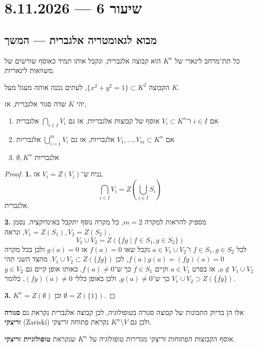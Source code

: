 \section{שיעור 6 --- 8.11.2026}
\subsection{מבוא לגאומטריה אלגברית --- המשך}
\begin{example}
	כל תת־מרחב לינארי של $K^n$ הוא קבוצה אלגברית, ונקבל אותו תמיד כאוסף שורשים של משוואות לינאריות.
\end{example}
\begin{example}
	הקבוצה $\{ x^2 + y^2 = 1 \} \subset K^2$, לעתים נכנה אותה מעגל מעל $K$.
\end{example}
\begin{proposition}
	יהי $K$ שדה סגור אלגברית, אז,
	\begin{enumerate}
		\item אם $i \in I$ ו־$V_i \subset K^n$ אוסף של קבוצות אלגבריות, אז גם $\bigcap_{i \in I} V_i$ אלגברית
		\item אם $V_1, \ldots, V_m \subset K^n$ אלגבריות, אז גם $\bigcup_{i = 1}^m V_i$ אלגבריות
		\item $\emptyset, K^n$ אלגבריות
	\end{enumerate}
\end{proposition}
\begin{proof}
	\textbf{1.}
	נניח ש־$V_i = Z(V_i)$ אז,
	\[
		\bigcap_{i \in I} V_i
		= Z(\bigcup_{i \in I} S_i)
	\]
	אלגברית.

	\textbf{2.}
	מספיק להראות למקרה $m = 2$, כל מקרה נוסף יתקבל באינדוקציה.
	נסמן $V_1 = Z(S_1), V_2 = Z(S_2)$, ונראה,
	\[
		V_1 \cup V_2
		= Z(\{ f g \mid f \in S_1, g \in S_2 \})
	\]
	לכל $f \in S_1, g \in S_2$ ו־$a \in V_1 \cup V_2$ נקבל שאו $f(a) = 0$ או $g(a) = 0$ ולכן בכל מקרה $f(a) g(a) = (f g)(a) = 0$, לכן $V_1 \cup V_2 \subset Z(\{ f g \})$.
	מהצד השני תהי $a \notin V_1 \cup V_2$, אז בפרט $a \in V_1$ וקיים $f \in S_1$ כך ש־$f(a) \ne 0$.
	באותו אופן קיים גם $g \in V_2$ כך ש־$g(a) \ne 0$, ולכן באופן כללי $(f g)(a) \ne 0$, כלומר $V_1 \cup V_2 \supset Z(\{ f g \})$.

	\textbf{3.}
	$K^n = Z(\emptyset)$ וכן $\emptyset = Z(\{ 1 \})$.
\end{proof}
אלו הן בדיוק התכונות של קבוצה סגורה בטופולוגיה, לכן קבוצה אלגברית נקראת גם \textbf{סגורה זריצקי} (Zariski) ולכן גם $K^n \setminus V$ נקראת פתוחה זריצקי.
\begin{corollary}
	אוסף הקבוצות הפתוחות זריצקי מגדירות טופולוגיה על $K^n$ שנקראת \textbf{טופולוגיית זריצקי}.
\end{corollary}

